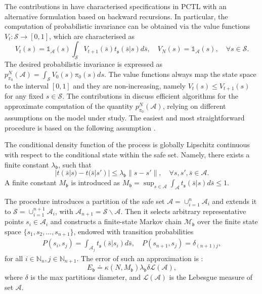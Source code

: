 \documentclass{LMCS}
\begin{document}
The contributions in \cite{APKL10,SA11,SAH12,SA12} have characterised specifications in PCTL with an alternative formulation based on backward recursions.  
In particular, the computation of probabilistic invariance can be obtained via the value functions $V_t:\mathcal S\rightarrow[0,1]$, 
which are characterised as 
\begin{equation}
\label{eq:bckwd_recursion}
V_t(s) = \mathds 1_{\mathcal A}(s)\int_{\mathcal S}V_{t+1}(\bar s)t_{\mathfrak s}(\bar s|s)d\bar s,\quad
V_N(s) = \mathds 1_{\mathcal A}(s), \quad\forall s\in\mathcal S.
\end{equation}
The desired probabilistic invariance is expressed as 
$p_{\pi_0}^N(\mathcal A) = \int_{\mathcal S}V_0(s)\pi_0(s)ds.$
The value functions always map the state space to the interval $[0,1]$ and they are non-increasing, 
namely $V_{t}(s)\le V_{t+1}(s)$ for any fixed $s \in \mathcal S$.  
The contributions in \cite{APKL10,SA11,SAH12,SA12} discuss efficient algorithms for the approximate computation of the quantity $p_{\pi_0}^N(\mathcal A)$,   
relying on different assumptions on the model under study. 
The easiest and most straightforward procedure is based on the following assumption \cite{APKL10}. 
\begin{asm}
\label{ass:back_cond_kernel}
The conditional density function of the process is globally Lipschitz continuous with respect to the conditional state within the safe set.   
Namely, there exists a finite constant $\lambda_{\mathfrak b}$, such that
\begin{equation*}
|t(\bar s|s)-t(\bar s|s')|\le \lambda_{\mathfrak b} \|s-s'\|, \quad \forall s,s',\bar s\in\mathcal A.
\end{equation*}
A finite constant $M_{\mathfrak b}$ is introduced as 
$M_{\mathfrak b} = \sup_{s\in\mathcal A}\int_{\mathcal A}t_{\mathfrak s}(\bar s|s)d\bar s\le 1$.
\end{asm}

The procedure introduces a partition of the safe set $\mathcal A = \cup_{i=1}^{n}\mathcal A_i$ and extends it to $\mathcal S = \cup_{i=1}^{n+1}\mathcal A_i$, 
with $\mathcal A_{n+1} = \mathcal S\backslash\mathcal A$.
Then it selects arbitrary representative points $s_i\in \mathcal A_i$
and constructs a finite-state Markov chain $\mathscr M_{\mathfrak b}$ over the finite state space $\{s_1,s_2,\ldots,s_{n+1}\}$, 
endowed with transition probabilities
\begin{equation}
\label{eq:trans_elem_rep}
\begin{array}{l}
P(s_i,s_j) = \int_{\mathcal A_j}t_{\mathfrak s}(\bar s|s_i)d\bar s,\quad P(s_{n+1},s_j) = \delta_{(n+1)j}, 
\end{array}
\end{equation}
for all $i\in\mathbb N_n, j\in\mathbb N_{n+1}$. The error of such an approximation is \cite{SAH12}:
\begin{equation*}
E_{\mathfrak b} \doteq \kappa(N,M_{\mathfrak b})\lambda_{\mathfrak b}\delta \mathcal L(\mathcal A),
\end{equation*} 
where $\delta$ is the max partitions diameter, 
and $\mathcal L(\mathcal A)$ is the Lebesgue measure of set $\mathcal A$. 
\end{document}
